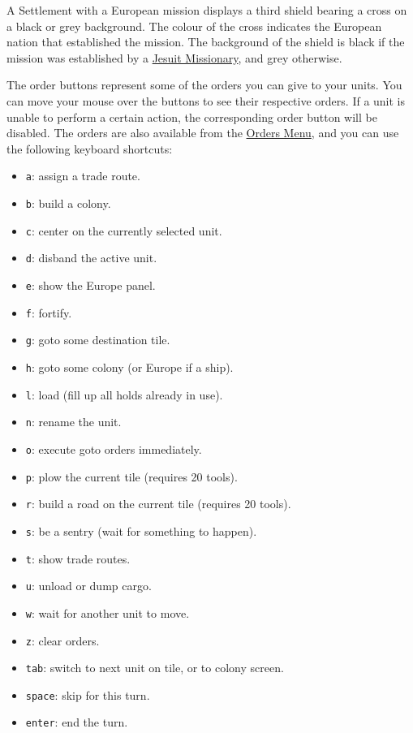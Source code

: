 \documentclass[12pt]{article}
\begin{document}
A Settlement with a European mission displays a third shield bearing a
cross on a black or grey background. The colour of the cross indicates
the European nation that established the mission. The background of
the shield is black if the mission was established by a
\hyperlink{Jesuit Missionary}{Jesuit Missionary}, and grey otherwise.

The order buttons represent some of the orders you can give to your
units. You can move your mouse over the buttons to see their
respective orders. If a unit is unable to perform a certain action,
the corresponding order button will be disabled. The orders are also
available from the \hyperlink{orders menu}{Orders Menu}, and you can
use the following \hypertarget{keyboard shortcuts}{keyboard shortcuts}:

\pagebreak[2]
\begin{itemize}
\item\verb$a$: assign a trade route.
\item\verb$b$: build a colony.
\item\verb$c$: center on the currently selected unit.
\item\verb$d$: disband the active unit.
\item\verb$e$: show the Europe panel.
\item\verb$f$: fortify.
\item\verb$g$: goto some destination tile.
\item\verb$h$: goto some colony (or Europe if a ship).
\item\verb$l$: load (fill up all holds already in use).
\item\verb$n$: rename the unit.
\item\verb$o$: execute goto orders immediately.
\item\verb$p$: plow the current tile (requires 20 tools).
\item\verb$r$: build a road on the current tile (requires 20 tools).
\item\verb$s$: be a sentry (wait for something to happen).
\item\verb$t$: show trade routes.
\item\verb$u$: unload or dump cargo.
\item\verb$w$: wait for another unit to move.
\item\verb$z$: clear orders.
\item\verb$tab$: switch to next unit on tile, or to colony screen.
\item\verb$space$: skip for this turn.
\item\verb$enter$: end the turn.

\end{itemize}
\end{document}
